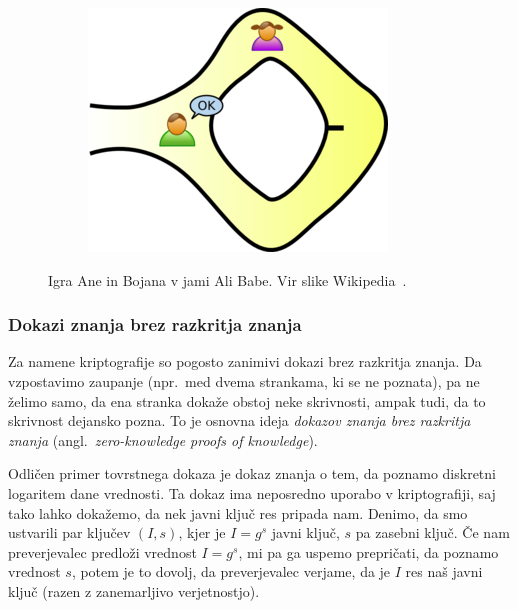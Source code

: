 \documentclass[isrm2, tisk]{fmfdelo}
\begin{document}
\begin{primer}
\begin{figure}[ht]
\begin{subfigure}{0.25\textwidth}
        \end{subfigure}
        \hspace{0.25cm}
        \begin{subfigure}{0.25\textwidth}
            \includegraphics[width=\textwidth]{images/zkp3.png}
        \end{subfigure}
        \caption[Jama Ali Babe.]{Igra Ane in Bojana v jami Ali Babe. Vir slike Wikipedia~\cite{zkp}.}
        \label{fig:alibaba}
    \end{figure}
\end{primer}

\subsubsection{Dokazi znanja brez razkritja znanja}
Za namene kriptografije so pogosto zanimivi dokazi brez razkritja znanja. Da vzpostavimo zaupanje
(npr.\ med dvema strankama, ki se ne poznata), pa ne želimo samo, da ena stranka dokaže obstoj neke
skrivnosti, ampak tudi, da to skrivnost dejansko pozna. To je osnovna ideja \textit{dokazov znanja
brez razkritja znanja} (angl.\ \textit{zero-knowledge proofs of knowledge}).

Odličen primer tovrstnega dokaza je dokaz znanja o tem, da poznamo diskretni logaritem dane vrednosti.
Ta dokaz ima neposredno uporabo v kriptografiji, saj tako lahko dokažemo, da nek javni ključ res
pripada nam. Denimo, da smo ustvarili par ključev $(I, s)$, kjer je $I = g^s$ javni ključ, $s$ pa
zasebni ključ. Če nam preverjevalec predloži vrednost $I = g^s$, mi pa ga uspemo prepričati, da poznamo
vrednost $s$, potem je to dovolj, da preverjevalec verjame, da je $I$ res naš javni ključ (razen z
zanemarljivo verjetnostjo).
\end{document}
